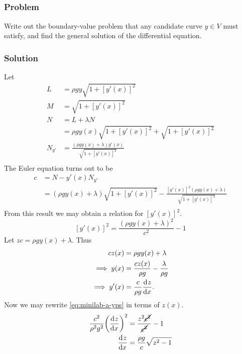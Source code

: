 \documentclass[12pt,twoside]{article}
\begin{document}
\subsection{}
\subsubsection*{Problem}
\label{sec:minilab-a}
Write out the boundary-value problem that any candidate curve $y\in V$ must
satisfy, and find the general solution of the differential equation.

\subsubsection*{Solution}
Let
\begin{align*}
  L &= \rho g y \sqrt{1+{[y'(x)]}^2} \\
  M &= \sqrt{1+{[y'(x)]}^2} \\
  N &= L + \lambda N \\
    &= \rho g y(x)\sqrt{1+{[y'(x)]}^2} + \sqrt{1+{[y'(x)]}^2} \\
  N_{y'} &= \frac{(\rho g y(x) + \lambda) y'(x)}{\sqrt{1+{[y'(x)]}^2}} \\
\end{align*}
The Euler equation turns out to be
\begin{align*}
  c &= N - y'(x)N_{y'} \\
    &= (\rho g y(x) + \lambda)\sqrt{1+{[y'(x)]}^2} -
      \frac{{[y'(x)]}^2(\rho g y(x) + \lambda)}{\sqrt{1+{[y'(x)]}^2}} \\
\end{align*}
From this result we may obtain a relation for ${[y'(x)]}^2$.
\begin{equation}
  \label{eq:minilab-a-yps}
  {[y'(x)]}^2 = \frac{{(\rho g y(x) + \lambda)}^2}{c^2} - 1
\end{equation}
Let $zc = \rho g y(x) + \lambda$. Thus
\begin{align*}
  cz(x) &= \rho g y(x) + \lambda \\
  \implies y(x) &= \frac{cz(x)}{\rho g} - \frac{\lambda}{\rho g} \\
  \implies y'(x) &= \frac{c}{\rho g} \frac{\mathrm{d}^{} {z}}{\mathrm{d}{x}^{}}.
\end{align*}
Now we may rewrite \cref{eq:minilab-a-yps} in terms of $z(x)$.
\begin{align*}
  \frac{c^2}{\rho^2g^2}{\left( \frac{\mathrm{d}^{} {z}}{\mathrm{d}{x}^{}} \right)}^2
  &= \frac{z^2\cancel{c^2}}{\cancel{c^2}} - 1 \\
  \frac{\mathrm{d}^{} {z}}{\mathrm{d}{x}^{}} &= \frac{\rho g }{c}\sqrt{z^2-1} \\
\end{align*}
\end{document}
